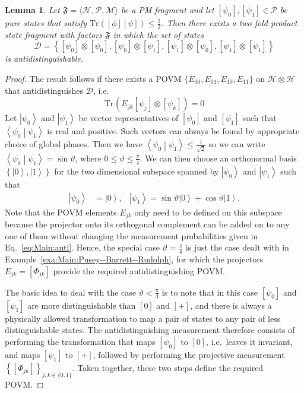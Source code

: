 \documentclass[DIV=calc,fontsize=12pt]{scrartcl} %
\theoremstyle{definition}
\theoremstyle{plain}
\newtheorem{lemma}[definition]{Lemma}
\newcommand{\Ket}[1]{\ensuremath{\left \vert #1 \right \rangle}}
\newcommand{\BraKet}[2]{\ensuremath{\left \langle #1 \middle \vert #2
\right \rangle}}
\newcommand{\Proj}[1]{\ensuremath{\left [ #1 \right ]}}
\newcommand{\Hilb}[1][]{\ensuremath{\mathcal{H}_{#1}}}
\newcommand{\Tr}[2][]{\ensuremath{\text{Tr}_{#1} \left ( #2 \right )}}
\begin{document}
\begin{lemma}
\label{lem:Main:anti}
Let $\mathfrak{F} = \langle \Hilb, \mathcal{P}, \mathcal{M} \rangle$
be a PM fragment and let $\Proj{\psi_0}, \Proj{\psi_1} \in
\mathcal{P}$ be pure states that satisfy $\mathrm{Tr} \left (
\Proj{\phi}\Proj{\psi} \right ) \leq \frac{1}{2}$.  Then there
exists a two fold product state fragment with factors $\mathfrak{F}$
in which the set of states
\begin{equation}
\mathcal{D} = \left \{\Proj{\psi_0} \otimes \Proj{\psi_0},
\Proj{\psi_0} \otimes \Proj{\psi_1}, \Proj{\psi_1} \otimes
\Proj{\psi_0}, \Proj{\psi_1} \otimes \Proj{\psi_1} \right \}
\end{equation}
is antidistinguishable.
\end{lemma}
\begin{proof}
The result follows if there exists a POVM
$\{E_{00},E_{01},E_{10},E_{11}\}$ on $\Hilb \otimes \Hilb$ that
antidistinguishes $\mathcal{D}$, i.e.
\begin{equation}
\label{eq:Main:anti}
\Tr{E_{jk} \Proj{\psi_j} \otimes \Proj{\psi_k}} = 0
\end{equation}
Let $\Ket{\psi_0}$ and $\Ket{\psi_1}$ be vector representatives of
$\Proj{\psi_0}$ and $\Proj{\psi_1}$ such that
$\BraKet{\psi_0}{\psi_1}$ is real and positive.  Such vectors can
always be found by appropriate choice of global phases.  Then we
have $\BraKet{\psi_0}{\psi_1} \leq \frac{1}{\sqrt{2}}$ so we can
write $\BraKet{\psi_0}{\psi_1} = \sin \vartheta$, where $0 \leq
\vartheta \leq \frac{\pi}{4}$.  We can then choose an orthonormal
basis $\left \{ \Ket{0}, \Ket{1} \right \}$ for the two dimensional
subspace spanned by $\Ket{\psi_0}$ and $\Ket{\psi_1}$ such that
\begin{align}
\Ket{\psi_0} & = \Ket{0}, & \Ket{\psi_1} = \sin \vartheta \Ket{0}
+ \cos \vartheta \Ket{1}.
\end{align}
Note that the POVM elements $E_{jk}$ only need to be defined on this
subspace because the projector onto its orthogonal complement can be
added on to any one of them without changing the measurement
probabilities given in Eq.~\eqref{eq:Main:anti}.  Hence, the special
case $\vartheta = \frac{\pi}{4}$ is just the case dealt with in
Example~\ref{exa:Main:Pusey--Barrett--Rudolph}, for which the projectors $E_{jk} =
\Proj{\Phi_{jk}}$ provide the required antidistinguishing POVM.

The basic idea to deal with the case $\vartheta < \frac{\pi}{4}$ is
to note that in this case $\Proj{\psi_0}$ and $\Proj{\psi_1}$ are
more distinguishable than $\Proj{0}$ and $\Proj{+}$, and there is
always a physically allowed transformation to map a pair of states
to any pair of less distinguishable states.  The antidistinguishing
measurement therefore consists of performing the transformation
that maps $\Proj{\psi_0}$ to $\Proj{0}$, i.e.\ leaves it invariant,
and maps $\Proj{\psi_1}$ to $\Proj{+}$, followed by performing the
projective measurement $\left \{ \Proj{\Phi_{jk}} \right \}_{j,k \in
\{0,1\}}$.  Taken together, these two steps define the required
POVM.


\end{proof}
\end{document}
